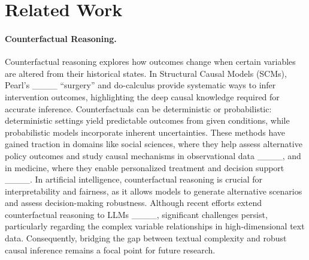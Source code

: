 \section{Related Work}
\paragraph{Counterfactual Reasoning.}
Counterfactual reasoning explores how outcomes change when certain variables are altered from their historical states. In Structural Causal Models (SCMs), Pearl’s ____ “surgery” and do-calculus provide systematic ways to infer intervention outcomes, highlighting the deep causal knowledge required for accurate inference. Counterfactuals can be deterministic or probabilistic: deterministic settings yield predictable outcomes from given conditions, while probabilistic models incorporate inherent uncertainties. These methods have gained traction in domains like social sciences, where they help assess alternative policy outcomes and study causal mechanisms in observational data ____, and in medicine, where they enable personalized treatment and decision support ____. In artificial intelligence, counterfactual reasoning is crucial for interpretability and fairness, as it allows models to generate alternative scenarios and assess decision-making robustness. Although recent efforts extend counterfactual reasoning to LLMs ____, significant challenges persist, particularly regarding the complex variable relationships in high-dimensional text data. Consequently, bridging the gap between textual complexity and robust causal inference remains a focal point for future research.

